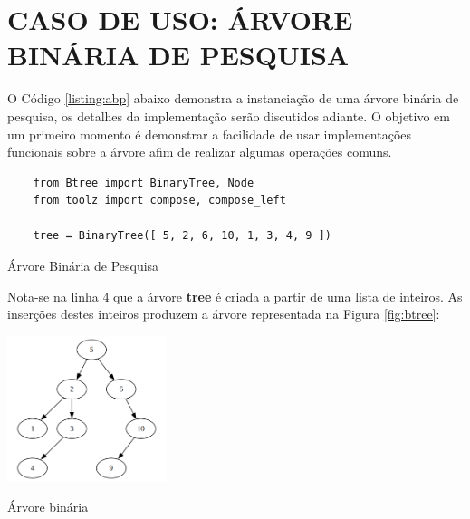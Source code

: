 \section{CASO DE USO: ÁRVORE BINÁRIA DE PESQUISA}

O Código \ref{listing:abp} abaixo demonstra a instanciação de uma árvore binária de pesquisa, os detalhes da implementação
serão discutidos adiante. O objetivo em um primeiro momento é demonstrar a facilidade de usar implementações funcionais
sobre a árvore afim de realizar algumas operações comuns.

\begin{listing}[H]
    \begin{verbatim}
    from Btree import BinaryTree, Node
    from toolz import compose, compose_left
    
    tree = BinaryTree([ 5, 2, 6, 10, 1, 3, 4, 9 ])
    \end{verbatim}
    \caption{Árvore Binária de Pesquisa}
    \label{listing:abp}
\end{listing}

Nota-se na linha 4 que a árvore \textbf{tree} é criada a partir de uma lista de inteiros.
As inserções destes inteiros produzem a árvore representada na Figura \ref{fig:btree}:

\begin{figlisting}[H]
    \centering
    \includegraphics[width=0.35\textwidth]{figs/btree.png} %
    \caption{Árvore binária} %
    \label{fig:btree}
\end{figlisting}

